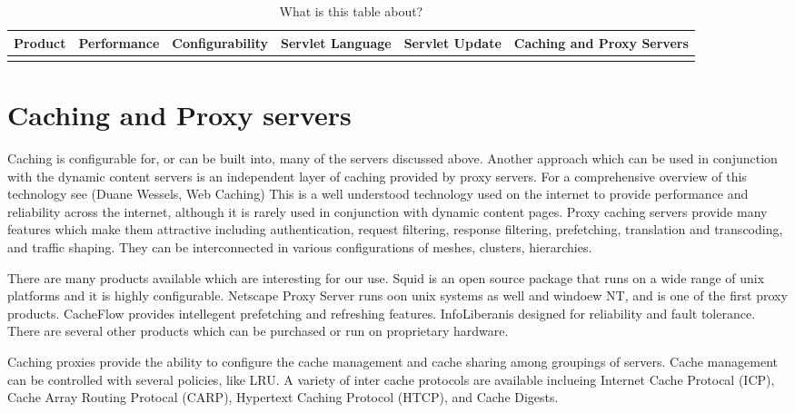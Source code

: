 
\begin{table}[h]
\centering
\caption{What is this table about?}
\begin{tabularx}{\textwidth}{XXXXXX}\toprule
Product  & Performance & Configurability & Servlet Language & Servlet Update & Caching and Proxy Servers \\ \midrule
         &             &                 &                  &                &                            \\ \bottomrule
\end{tabularx}
\end{table}

\section{Caching and Proxy servers}

Caching is configurable for, or can be built into, many of the servers
discussed above. Another approach which can be used in conjunction
with the dynamic content servers is an independent layer of caching
provided by proxy servers. For a comprehensive overview of this
technology see (Duane Wessels, Web Caching) This is a well understood
technology used on the internet to provide performance and reliability
across the internet, although it is rarely used in conjunction with
dynamic content pages. Proxy caching servers provide many features
which make them attractive including authentication, request
filtering, response filtering, prefetching, translation and
transcoding, and traffic shaping. They can be interconnected in
various configurations of meshes, clusters, hierarchies.

There are many products available which are interesting for our
use. Squid is an open source package that runs on a wide range of unix
platforms and it is highly configurable. Netscape Proxy Server runs
oon unix systems as well and windoew NT, and is one of the first proxy
products. CacheFlow provides intellegent prefetching and refreshing
features. InfoLiberanis designed for reliability and fault
tolerance. There are several other products which can be purchased or
run on proprietary hardware.

Caching proxies provide the ability to configure the cache management
and cache sharing among groupings of servers. Cache management can be
controlled with several policies, like LRU. A variety of inter cache
protocols are available inclueing Internet Cache Protocal (ICP), Cache
Array Routing Protocal (CARP), Hypertext Caching Protocol (HTCP), and
Cache Digests.

